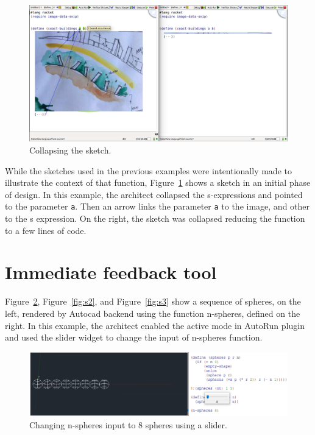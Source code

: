 \begin{figure}[!h]
  \centering
  \includegraphics[width=1\textwidth]{images/coast}
    \caption{Collapsing the sketch.}
  \label{fig:coast}
\end{figure}

While the sketches used in the previous examples were intentionally made to illustrate the context of that function, Figure~\ref{fig:coast} shows a sketch in an initial phase of design.  In this example, the architect collapsed the s-expressions and pointed to the parameter \texttt{a}. Then an arrow links the parameter \texttt{a} to the image, and other to the s expression. On the right, the sketch was collapsed reducing the function to a few lines of code.


\section{Immediate feedback tool}

Figure~\ref{fig:s1}, Figure~\ref{fig:s2}, and Figure~\ref{fig:s3} show a sequence of spheres, on the left, rendered by Autocad backend using the function n-spheres, defined on the right. In this example, the architect enabled the active mode in AutoRun plugin and used the slider widget to change the input of n-spheres function.

\begin{figure}[!h]
  \centering
  \includegraphics[width=1\textwidth]{images/sliders1}
    \caption{Changing n-spheres input to 8 spheres using a slider.}
  \label{fig:s1}
\end{figure}


